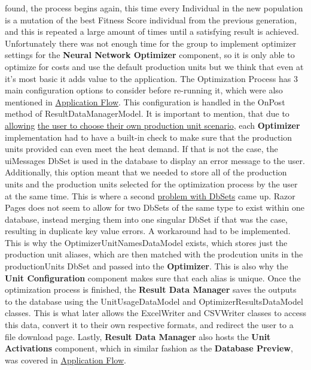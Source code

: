 \documentclass[12pt]{report}
\begin{document}
found, the process begins again, this time every Individual in the new population is a mutation of the best Fitness Score individual from the previous generation,
and this is repeated a large amount of times until a satisfying result is achieved. Unfortunately there was not enough time
for the group to implement optimizer settings for the \textbf{Neural Network Optimizer} component, so it is only able to optimize for costs and use the default production units
but we think that even at it's most basic it adds value to the application.
The Optimization Process has 3 main configuration options to consider before re-running it, which were also mentioned in \hyperref[sec:appflow]{Application Flow}.
This configuration is handled in the OnPost method of ResultDataManagerModel. It is important to mention, that due to \underline{allowing}
\underline{the user to choose their own production unit scenario}, each \textbf{Optimizer} implementation had to have a built-in check to
make sure that the production units provided can even meet the heat demand. If that is not the case, the uiMessages
DbSet is used in the database to display an error message to the user.
Additionally, this option meant that we needed to store all of the production units and the production units selected for 
the optimization process by the user at the same time. This is where a second \underline{problem with DbSets} came up.
Razor Pages does not seem to allow for two DbSets of the same type to exist within one database, instead
merging them into one singular DbSet if that was the case, resulting in duplicate key value errors. A workaround had to be implemented.
This is why the OptimizerUnitNamesDataModel exists, which stores just the production unit aliases, which are then matched
with the prodcution units in the productionUnits DbSet and passed into the \textbf{Optimizer}. This is also why the \textbf{Unit Configuration}
component makes sure that each alias is unique.
Once the optimization process is finished, the \textbf{Result Data Manager} saves the outputs to the database using
the UnitUsageDataModel and OptimizerResultsDataModel classes. This is what later allows the ExcelWriter and CSVWriter classes
to access this data, convert it to their own respective formats, and redirect the user to a file download page.
Lastly, \textbf{Result Data Manager} also hosts the \textbf{Unit Activations} component, which in similar fashion
as the \textbf{Database Preview}, was covered in \hyperref[sec:appflow]{Application Flow}.


\end{document}
